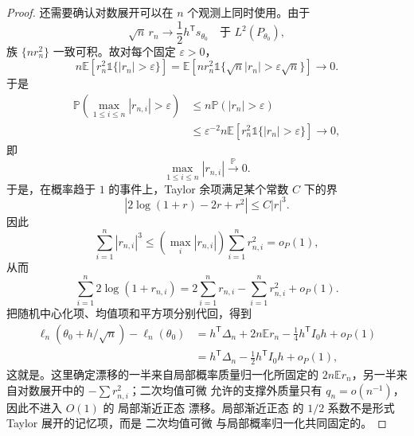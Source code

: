 \begin{proof}
还需要确认对数展开可以在 $n$ 个观测上同时使用。由于
\[
 \sqrt n\,r_n
 \longrightarrow
 \frac12h^{\mathsf T}s_{\theta_0}
 \quad\text{于 }L^2(P_{\theta_0}),
\]
族 $\{n r_n^2\}$ 一致可积。故对每个固定 $\varepsilon>0$，
\[
 n\mathbb E\!\left[
 r_n^2\mathds{1}\{|r_n|>\varepsilon\}
 \right]
 =\mathbb E\!\left[
 nr_n^2\mathds{1}\{\sqrt n|r_n|>\varepsilon\sqrt n\}
 \right]
 \to0.
\]
于是
\begin{align*}
 \mathbb P\!\left(
 \max_{1\le i\le n}|r_{n,i}|>\varepsilon
 \right)
 &\le n\mathbb P(|r_n|>\varepsilon)\\
 &\le\varepsilon^{-2}n\mathbb E\!\left[
 r_n^2\mathds{1}\{|r_n|>\varepsilon\}
 \right]
 \to0,
\end{align*}
即
\[
 \max_{1\le i\le n}|r_{n,i}|\xrightarrow{\mathbb P}0.
\]
于是，在概率趋于 $1$ 的事件上，Taylor 余项满足某个常数 $C$ 下的界
\[
 \left|2\log(1+r)-2r+r^2\right|
 \le C|r|^3.
\]
因此
\[
 \sum_{i=1}^n|r_{n,i}|^3
 \le
 \left(\max_i|r_{n,i}|\right)
 \sum_{i=1}^nr_{n,i}^2
 =o_P(1),
\]
从而
\[
 \sum_{i=1}^n2\log(1+r_{n,i})
 =2\sum_{i=1}^nr_{n,i}
 -\sum_{i=1}^nr_{n,i}^2
 +o_P(1).
\]
把随机中心化项、均值项和平方项分别代回，得到
\begin{align*}
 \ell_n(\theta_0+h/\sqrt n)-\ell_n(\theta_0)
 &=h^{\mathsf T}\Delta_n
   +2n\mathbb E r_n
   -\frac14h^{\mathsf T}I_0h
   +o_P(1)\\
 &=h^{\mathsf T}\Delta_n
   -\frac12h^{\mathsf T}I_0h
   +o_P(1),
\end{align*}
这就是。这里确定漂移的一半来自局部概率质量归一化所固定的 $2n\mathbb E r_n$，另一半来自对数展开中的 $-\sum r_{n,i}^2$；二次均值可微 允许的支撑外质量只有 $q_n=o(n^{-1})$，因此不进入 $O(1)$ 的 局部渐近正态 漂移。局部渐近正态 的 $1/2$ 系数不是形式 Taylor 展开的记忆项，而是 二次均值可微 与局部概率归一化共同固定的。
\end{proof}

